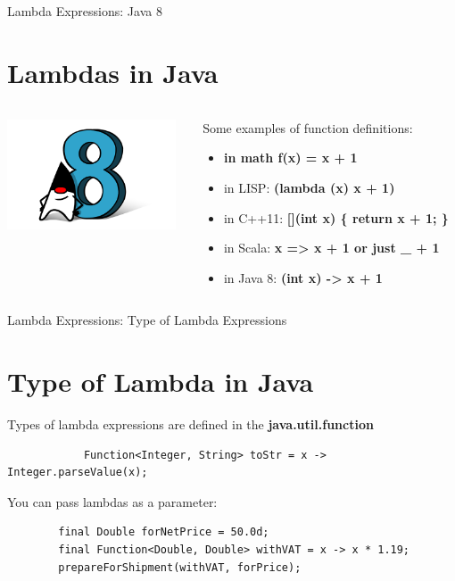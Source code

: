 \documentclass{beamer}
\begin{document}
	
	\begin{frame}{Lambda Expressions: Java 8}
	\section{Lambdas in Java}
	\begin{columns}
    	\begin{column}{0.3\textwidth}
			\centering
			\includegraphics[width=5cm]{duke8}	
    	\end{column}
    	\begin{column}{0.7\textwidth}
			Some examples of function definitions:
			\begin{itemize}
				\item \textbf{in math f(x) = x + 1} 
				\item in LISP: \textbf{(lambda (x) x + 1)}
				\item in C++11: \textbf{[](int x) \{ return x + 1; \} }
				\item in Scala: \textbf{x => x + 1 or just \_ + 1}
				\item in Java 8: \textbf{(int x) -> x + 1}
				\end{itemize}
  		\end{column}
	\end{columns}
	\end{frame}	

	\begin{frame}[fragile]{Lambda Expressions: Type of Lambda Expressions}
		\section{Type of Lambda in Java}
		Types of lambda expressions are defined in the \textbf{java.util.function}
		\begin{lstlisting}
			Function<Integer, String> toStr = x -> Integer.parseValue(x);

		\end{lstlisting}
		
		You can pass lambdas as a parameter:
		
		\begin{lstlisting}
		final Double forNetPrice = 50.0d;
		final Function<Double, Double> withVAT = x -> x * 1.19;
		prepareForShipment(withVAT, forPrice);
		\end{lstlisting}
	\end{frame}	
	
\end{document}

